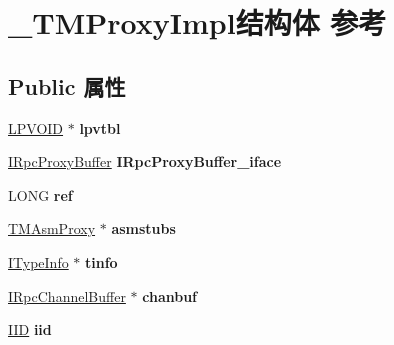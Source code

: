 \hypertarget{struct___t_m_proxy_impl}{}\section{\+\_\+\+T\+M\+Proxy\+Impl结构体 参考}
\label{struct___t_m_proxy_impl}
\subsection*{Public 属性}
\begin{DoxyCompactItemize}
\item 
\mbox{\label{struct___t_m_proxy_impl_a8735f5b41fe92a5e550ca09ca5e7c67c}} 
\hyperlink{interfacevoid}{L\+P\+V\+O\+ID} $\ast$ {\bfseries lpvtbl}
\item 
\mbox{\label{struct___t_m_proxy_impl_adac11d8c3b3c96cb97539af4738eca70}} 
\hyperlink{interface_i_rpc_proxy_buffer}{I\+Rpc\+Proxy\+Buffer} {\bfseries I\+Rpc\+Proxy\+Buffer\+\_\+iface}
\item 
\mbox{\label{struct___t_m_proxy_impl_aa947a228490c5950c5fd4db834d399b1}} 
L\+O\+NG {\bfseries ref}
\item 
\mbox{\label{struct___t_m_proxy_impl_a858b4930c912f9eee50999e7f8b6a83a}} 
\hyperlink{struct___t_m_asm_proxy}{T\+M\+Asm\+Proxy} $\ast$ {\bfseries asmstubs}
\item 
\mbox{\label{struct___t_m_proxy_impl_ac95071e8761f1825cd8122afc88c2948}} 
\hyperlink{interface_i_type_info}{I\+Type\+Info} $\ast$ {\bfseries tinfo}
\item 
\mbox{\label{struct___t_m_proxy_impl_a07875e08b1816cabd0e99508b42c4686}} 
\hyperlink{interface_i_rpc_channel_buffer}{I\+Rpc\+Channel\+Buffer} $\ast$ {\bfseries chanbuf}
\item 
\mbox{\label{struct___t_m_proxy_impl_af4f54379fb9b7f62ceea26eeb504968b}} 
\hyperlink{struct___i_i_d}{I\+ID} {\bfseries iid}
\item 
\mbox{\label{struct___t_m_proxy_impl_ad0bdbe9c8e13b9d7e2d53f5aa71c2529}} 

\end{DoxyCompactItemize}
